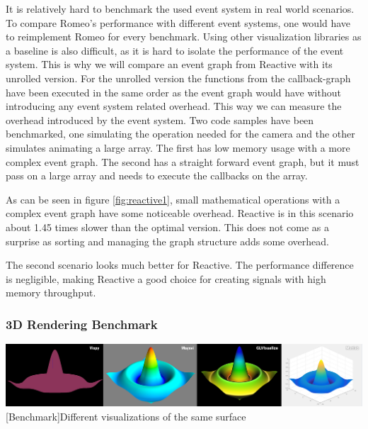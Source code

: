 It is relatively hard to benchmark the used event system in real world scenarios. To compare Romeo's performance with different event systems, one would have to reimplement Romeo for every benchmark.
Using other visualization libraries as a baseline is also difficult, as it is hard to isolate the performance of the event system.
This is why we will compare an event graph from Reactive with its unrolled version.
For the unrolled version the functions from the callback-graph have been executed in the same order as the event graph would have without introducing any event system related overhead.
This way we can measure the overhead introduced by the event system.
Two code samples have been benchmarked, one simulating the operation needed for the camera and the other simulates animating a large array.
The first has low memory usage with a more complex event graph. The second has a straight forward event graph, but it must pass on a large array and needs to execute the callbacks on the array.

As can be seen in figure \ref{fig:reactive1}, small mathematical operations with a complex event graph have some noticeable overhead. Reactive is in this scenario about 1.45 times slower than the optimal version.
This does not come as a surprise as sorting and managing the graph structure adds some overhead.

The second scenario looks much better for Reactive. The performance difference is negligible, making Reactive a good choice for creating signals with high memory throughput.

\subsubsection{3D Rendering Benchmark}

\begin{minipage}{\linewidth}
    \centering
    \includegraphics[width=\linewidth]{graphics/vispy_mayavi_romeo.jpg}
    [Benchmark]{Different visualizations of the same surface}
    \label{fig:reactive1}
\end{minipage}

